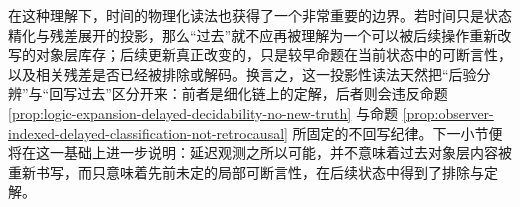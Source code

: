 在这种理解下，时间的物理化读法也获得了一个非常重要的边界。若时间只是状态精化与残差展开的投影，那么“过去”就不应再被理解为一个可以被后续操作重新改写的对象层库存；后续更新真正改变的，只是较早命题在当前状态中的可断言性，以及相关残差是否已经被排除或解码。换言之，这一投影性读法天然把“后验分辨”与“回写过去”区分开来：前者是细化链上的定解，后者则会违反命题 \ref{prop:logic-expansion-delayed-decidability-no-new-truth} 与命题 \ref{prop:observer-indexed-delayed-classification-not-retrocausal} 所固定的不回写纪律。下一小节便将在这一基础上进一步说明：延迟观测之所以可能，并不意味着过去对象层内容被重新书写，而只意味着先前未定的局部可断言性，在后续状态中得到了排除与定解。

